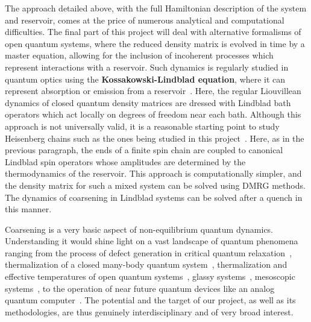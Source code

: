 \documentclass[a4paper,10pt]{report}
\begin{document}
The approach detailed above, with the full Hamiltonian description of the system and reservoir, comes at the price of numerous analytical and computational difficulties. The final part of this project will deal with alternative formalisms of open quantum systems, where the reduced density matrix is evolved in time by a master equation, allowing for the inclusion of incoherent processes which represent interactions with a reservoir. Such dynamics is regularly studied in quantum optics using the \textbf{Kossakowski-Lindblad equation}, where it can represent absorption or emission from a reservoir~\cite{lindblad}. Here, the regular Liouvillean dynamics of closed quantum density matrices are dressed with Lindblad bath operators which act locally on degrees of freedom near each bath. Although this approach is not universally valid, it is a reasonable starting point to study Heisenberg chains such as the ones being studied in this project~\cite{lindblad}. Here, as in the previous paragraph, the ends of 
a finite spin chain are coupled to canonical Lindblad spin operators whose amplitudes are determined by the thermodynamics of the reservoir.  This approach is computationally simpler, and the density matrix for such a mixed system can be solved using DMRG methods. The dynamics of coarsening in Lindblad systems can be solved after a quench in this manner.

Coarsening is a very basic aspect of non-equilibrium quantum dynamics. Understanding it would shine light on a vast landscape of quantum phenomena ranging from the process of defect generation in critical quantum relaxation~\cite{relaxation}, thermalization of a closed many-body quantum system~\cite{ rigol:nature:etc}, thermalization and effective temperatures of open quantum systems~\cite{thermopen}, glassy systems~\cite{glassy}, mesoscopic systems~\cite{meso}, to the operation of near future quantum devices like an analog quantum computer~\cite{arnab1}. The potential and the target of our project, as well as its methodologies, are thus genuinely interdisciplinary and of very broad interest.
\end{document}
